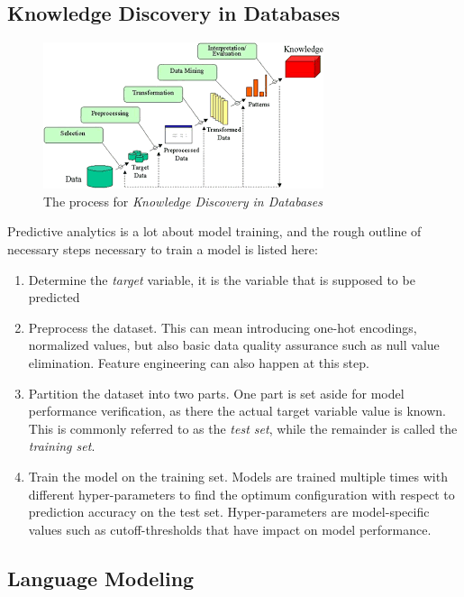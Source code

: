 \subsection{Knowledge Discovery in Databases}
\begin{figure}
	\centering
	\includegraphics[width=\textwidth]{gfx/kdd_process}
	\caption{The process for \textit{Knowledge Discovery in Databases}}
	\label{fig:kdd_process}
\end{figure}
Predictive analytics is a lot about model training, and the rough outline of necessary steps necessary to train a model is listed here:
\begin{enumerate}
	\item Determine the \textit{target} variable, it is the variable that is supposed to be predicted
	\item Preprocess the dataset. This can mean introducing one-hot encodings, normalized values, but also basic data quality assurance such as null value elimination. Feature engineering can also happen at this step.
	\item Partition the dataset into two parts. One part is set aside for model performance verification, as there the actual target variable value is known. This is commonly referred to as the \textit{test set}, while the remainder is called the \textit{training set}.
	\item Train the model on the training set. Models are trained multiple times with different hyper-parameters to find the optimum configuration with respect to prediction accuracy on the test set. Hyper-parameters are model-specific values such as cutoff-thresholds that have impact on model performance.
\end{enumerate}

\subsection{Language Modeling}
